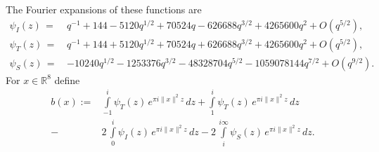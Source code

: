 \documentclass{scrartcl}
\newcommand{\R}{\mathbb{R}}
\begin{document}
The Fourier expansions of these functions are
\begin{align}
  \psi_I(z)\,=\,&q^{-1} + 144 - 5120 q^{1/2} + 70524 q - 626688 q^{3/2} + 4265600 q^2  + O(q^{5/2}) ,\label{eqn: psi fourier I}\\
  \psi_T(z)\,=\,&q^{-1} + 144 + 5120 q^{1/2} + 70524 q + 626688 q^{3/2} + 4265600 q^2  + O(q^{5/2}) ,\label{eqn: psi fourier T}\\
  \psi_S(z)\,=\,&-10240 q^{1/2} - 1253376 q^{3/2} - 48328704 q^{5/2} - 1059078144 q^{7/2}+O(q^{9/2}).\label{eqn: psi fourier S}
\end{align}
For $x\in\R^8$ define
\begin{align}\label{eqn: b(r) definition}
  b(x):= & \int\limits_{-1}^{i}\psi_T(z)\,e^{\pi i \|x\|^2 z}\,dz
    + \int\limits_{1}^{i}\psi_T(z)\,e^{\pi i \|x\|^2 z}\,dz \\
  -& 2\,\int\limits_{0}^{i}\psi_I(z)\,e^{\pi i \|x\|^2 z}\,dz
  - 2\,\int\limits_{i}^{i\infty}\psi_S(z)\,e^{\pi i \|x\|^2 z}\,dz \nonumber.
\end{align}
\end{document}

